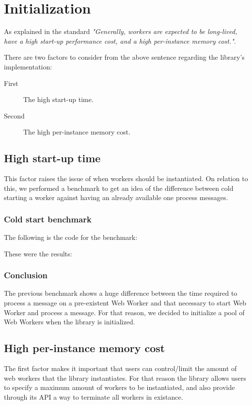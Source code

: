 \section{Initialization}

As explained in the standard \cite{w3c-ww} \textit{"Generally, workers are expected to be long-lived, have a high start-up performance cost, and a high per-instance memory cost."}.

There are two factors to consider from the above sentence regarding the library's implementation:

\begin{description}
\item[First] The high start-up time.
\item[Second] The high per-instance memory cost.
\end{description}

\subsection{High start-up time}
This factor raises the issue of when workers should be instantiated. On relation to this, we performed a benchmark to get an idea of the difference between cold starting a worker against having an already available one process messages.

\subsubsection{Cold start benchmark}
The following is the code for the benchmark:

These were the results:

\subsubsection{Conclusion}
The previous benchmark shows a huge difference between the time required to process a message on a pre-existent Web Worker and that necessary to start Web Worker and process a message. For that reason, we decided to initialize a pool of Web Workers when the library is initialized.

\subsection{High per-instance memory cost}
The first factor makes it important that users can control/limit the amount of web workers that the library instantiates. For that reason the library allows users to specify a maximum amount of workers to be instantiated, and also provide through its API a way to terminate all workers in existance.

